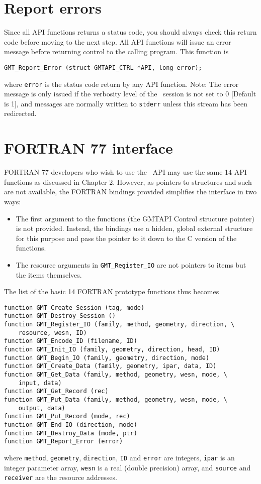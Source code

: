 \documentclass{report}
\begin{document}
\section{Report errors}

Since all API functions returns a status code, you should always check this return code before
moving to the next step.  All API functions will issue an error message before returning control
to the calling program.  This function is

\begin{verbatim}
GMT_Report_Error (struct GMTAPI_CTRL *API, long error);
\end{verbatim}
where \texttt{error} is the status code return by any API function.  Note: The error message is
only issued if the verbosity level of the \GMT\ session is not set to 0 [Default is 1], and
messages are normally written to \texttt{stderr} unless this stream has been redirected.

\section{FORTRAN 77 interface} 

FORTRAN 77 developers who wish to use the \GMT\ API may use the same 14 API functions as discussed in Chapter 2.
However, as pointers to structures and such are not available, the FORTRAN bindings provided simplifies the
interface in two ways:
\begin{itemize}
\item The first argument to the functions (the GMTAPI Control structure pointer) is not provided.  Instead,
the bindings use a hidden, global external structure for this purpose and pass the pointer to it down to
the C version of the functions.
\item The resource arguments in \texttt{GMT\_Register\_IO} are not pointers to
items but the items themselves.
\end{itemize}
The list of the basic 14 FORTRAN prototype functions thus becomes
\begin{verbatim}
function GMT_Create_Session (tag, mode)
function GMT_Destroy_Session ()
function GMT_Register_IO (family, method, geometry, direction, \
    resource, wesn, ID)
function GMT_Encode_ID (filename, ID)
function GMT_Init_IO (family, geometry, direction, head, ID)
function GMT_Begin_IO (family, geometry, direction, mode)
function GMT_Create_Data (family, geometry, ipar, data, ID)
function GMT_Get_Data (family, method, geometry, wesn, mode, \
	input, data)
function GMT_Get_Record (rec)
function GMT_Put_Data (family, method, geometry, wesn, mode, \
	output, data)
function GMT_Put_Record (mode, rec)
function GMT_End_IO (direction, mode)
function GMT_Destroy_Data (mode, ptr)
function GMT_Report_Error (error)
\end{verbatim}
where \texttt{method}, \texttt{geometry}, \texttt{direction}, \texttt{ID} and \texttt{error} are integers,
\texttt{ipar} is an integer parameter array, \texttt{wesn} is a real (double precision) array,
and \texttt{source} and \texttt{receiver} are the resource addresses.

\clearpage
\thispagestyle{headings}
\printindex
\thispagestyle{headings}
\end{document}
